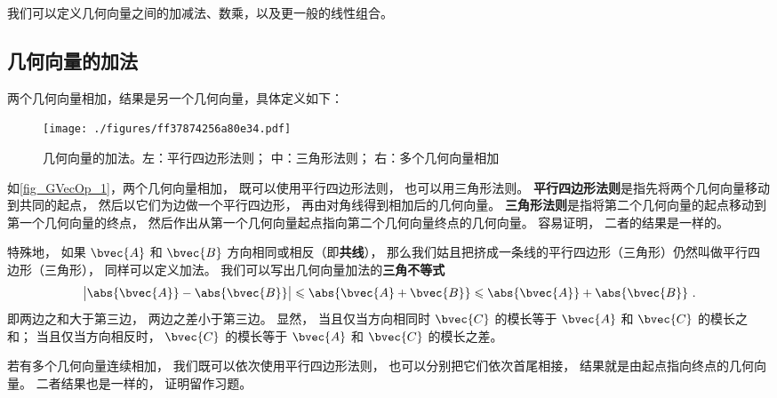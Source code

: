 

% 
% 

我们可以定义几何向量之间的加减法、数乘，以及更一般的线性组合。

\subsection{几何向量的加法}
两个几何向量相加，结果是另一个几何向量，具体定义如下：
\begin{figure}[ht]
\centering
\texttt{[image: ./figures/ff37874256a80e34.pdf]}
\caption{几何向量的加法。左：平行四边形法则； 中：三角形法则； 右：多个几何向量相加} \label{fig_GVecOp_1}
\end{figure}
如\autoref{fig_GVecOp_1}，两个几何向量相加， 既可以使用平行四边形法则， 也可以用三角形法则。 \textbf{平行四边形法则}是指先将两个几何向量移动到共同的起点， 然后以它们为边做一个平行四边形， 再由对角线得到相加后的几何向量。 \textbf{三角形法则}是指将第二个几何向量的起点移动到第一个几何向量的终点， 然后作出从第一个几何向量起点指向第二个几何向量终点的几何向量。 容易证明， 二者的结果是一样的。

特殊地， 如果 $\bvec{A}$ 和 $\bvec{B}$ 方向相同或相反（即\textbf{共线}）， 那么我们姑且把挤成一条线的平行四边形（三角形）仍然叫做平行四边形（三角形）， 同样可以定义加法。 我们可以写出几何向量加法的\textbf{三角不等式}
\begin{equation}
\big|\abs{\bvec{A}} - \abs{\bvec{B}}\big| \leqslant \abs{\bvec{A} + \bvec{B}} \leqslant \abs{\bvec{A}} + \abs{\bvec{B}}~.
\end{equation}
即两边之和大于第三边， 两边之差小于第三边。 显然， 当且仅当方向相同时 $\bvec{C}$ 的模长等于 $\bvec{A}$ 和 $\bvec{C}$ 的模长之和； 当且仅当方向相反时， $\bvec{C}$ 的模长等于 $\bvec{A}$ 和 $\bvec{C}$ 的模长之差。 

若有多个几何向量连续相加， 我们既可以依次使用平行四边形法则， 也可以分别把它们依次首尾相接， 结果就是由起点指向终点的几何向量。 二者结果也是一样的， 证明留作习题。

